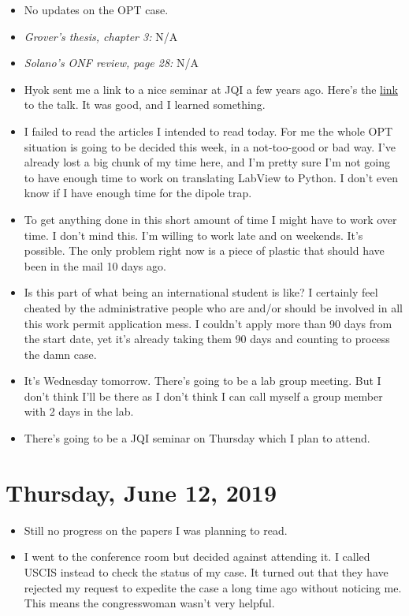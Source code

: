 \documentclass{book}
\theoremstyle{definition}
\begin{document}
\begin{itemize}
	\item No updates on the OPT case. 
	
	
	\item \textit{Grover's thesis, chapter 3:} N/A
	
	
	\item \textit{Solano's ONF review, page 28:} N/A
	
	\item Hyok sent me a link to a nice seminar at JQI a few years ago. Here's the \href{https://www.youtube.com/watch?v=IFsB554TCZY}{link} to the talk. It was good, and I learned something.
	
	\item I failed to read the articles I intended to read today. For me the whole OPT situation is going to be decided this week, in a not-too-good or bad way. I've already lost a big chunk of my time here, and I'm pretty sure I'm not going to have enough time to work on translating LabView to Python. I don't even know if I have enough time for the dipole trap. 
	
	\item To get anything done in this short amount of time I might have to work over time. I don't mind this. I'm willing to work late and on weekends. It's possible. The only problem right now is a piece of plastic that should have been in the mail 10 days ago.
	
	\item Is this part of what being an international student is like? I certainly feel cheated by the administrative people who are and/or should be involved in all this work permit application mess. I couldn't apply more than 90 days from the start date, yet it's already taking them 90 days and counting to process the damn case. 
	
	\item It's Wednesday tomorrow. There's going to be a lab group meeting. But I don't think I'll be there as I don't think I can call myself a group member with 2 days in the lab.
	
	\item There's going to be a JQI seminar on Thursday which I plan to attend. 
	
	
\end{itemize}



\section*{Thursday, June 12, 2019}
\begin{itemize}
	\item Still no progress on the papers I was planning to read.
	
	\item I went to the conference room but decided against attending it. I called USCIS instead to check the status of my case. It turned out that they have rejected my request to expedite the case a long time ago without noticing me. This means the congresswoman wasn't very helpful.
\end{itemize}
\end{document}
